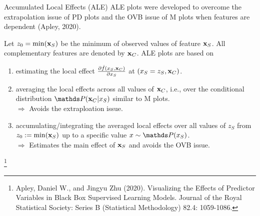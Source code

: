 \documentclass[11pt,compress,t,notes=noshow, xcolor=table]{beamer}
\begin{document}
\begin{vbframe}{Accumulated Local Effects (ALE)}
ALE plots were developed to overcome the extrapolation issue of PD plots and the OVB issue of M plots when features are dependent (Apley, 2020).

\lz

Let $z_0 = \min(\xv_S)$ be the minimum of observed values of feature $\xv_S$. All complementary features are denoted by $\xv_C$. ALE plots are based on
\begin{enumerate}
\item estimating the local effect $\frac{\partial \fh(x_S, \xv_C)}{\partial x_S}$ at $(x_S = z_S, \xv_C)$.
\item averaging the local effects across all values of $\xv_C$, i.e., over the conditional distribution $\P(\xv_C|x_S)$ similar to M plots.\\
$\Rightarrow$ Avoids the extraploation issue.
\item accumulating/integrating the averaged local effects over all values of $z_S$ from $z_0 := \min(\xv_S)$ up to a specific value $x \sim \P(x_S)$.\\
$\Rightarrow$ Estimates the main effect of $\xv_S$ and avoids the OVB issue.
\end{enumerate}

\footnote[frame]{Apley, Daniel W., and Jingyu Zhu (2020). Visualizing the Effects of Predictor Variables in Black Box Supervised Learning Models. Journal of the Royal Statistical Society: Series B (Statistical Methodology) 82.4: 1059-1086.}
\end{vbframe}
\end{document}
